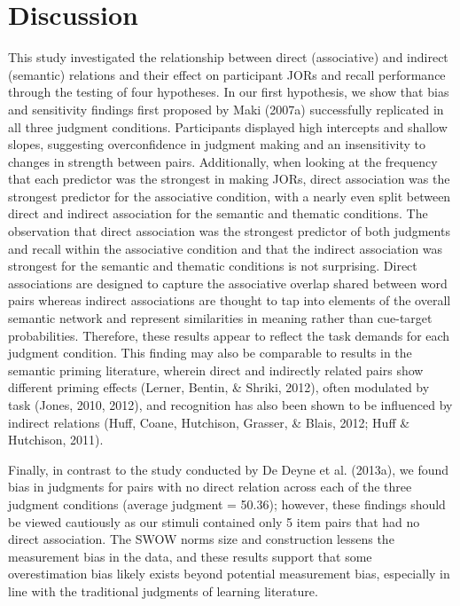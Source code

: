 \documentclass[english,,man]{apa6}
\begin{document}
\hypertarget{discussion}{%
\section{Discussion}\label{discussion}}

This study investigated the relationship between direct (associative) and indirect (semantic) relations and their effect on participant JORs and recall performance through the testing of four hypotheses. In our first hypothesis, we show that bias and sensitivity findings first proposed by Maki (2007a) successfully replicated in all three judgment conditions. Participants displayed high intercepts and shallow slopes, suggesting overconfidence in judgment making and an insensitivity to changes in strength between pairs. Additionally, when looking at the frequency that each predictor was the strongest in making JORs, direct association was the strongest predictor for the associative condition, with a nearly even split between direct and indirect association for the semantic and thematic conditions. The observation that direct association was the strongest predictor of both judgments and recall within the associative condition and that the indirect association was strongest for the semantic and thematic conditions is not surprising. Direct associations are designed to capture the associative overlap shared between word pairs whereas indirect associations are thought to tap into elements of the overall semantic network and represent similarities in meaning rather than cue-target probabilities. Therefore, these results appear to reflect the task demands for each judgment condition. This finding may also be comparable to results in the semantic priming literature, wherein direct and indirectly related pairs show different priming effects (Lerner, Bentin, \& Shriki, 2012), often modulated by task (Jones, 2010, 2012), and recognition has also been shown to be influenced by indirect relations (Huff, Coane, Hutchison, Grasser, \& Blais, 2012; Huff \& Hutchison, 2011).

Finally, in contrast to the study conducted by De Deyne et al. (2013a), we found bias in judgments for pairs with no direct relation across each of the three judgment conditions (average judgment = 50.36); however, these findings should be viewed cautiously as our stimuli contained only 5 item pairs that had no direct association. The SWOW norms size and construction lessens the measurement bias in the data, and these results support that some overestimation bias likely exists beyond potential measurement bias, especially in line with the traditional judgments of learning literature.
\end{document}
